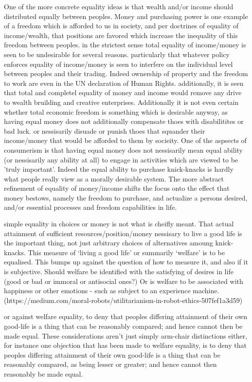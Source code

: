 One of the more concrete equality ideas is that wealth and/or income should distributed equally between peoples.
Money and purchasing power is one example of a freedom which is afforded to us in society, and per doctrines of equality of income/wealth, that positions are favored which increase the inequality of this freedom between peoples.
in the strictest sense total equality of income/money is seen to be undesirable for several reasons.
particularly that whatever policy enforces equality of income/money is seen to interfere on the individual level between peoples and their trading.
Indeed ownership of property and the freedom to work are even in the UN declaration of Human Rights. additionally, it is seen that total and completel equality of money and income would remove any drive to wealth bruilding and creative enterprises.
Additionally it is not even certain whether total economic freedom is something which is desirable anyway, as having equal money does not additionally compensate thoes with disabilitites or bad luck.
or nessisarily disuade or punish thoes that squander their income/money that would be afforded to them by socieity.
One of the aspsects of consumerism is that having equal money does not nessisarily mean equal ability (or nessisarily any ability at all) to engage in activities which are viewed to be 'truly important'.
Indeed the equal ability to purchase knick-knacks is hardly what people really view as a morally desirable system.
The more abstract refinement of equality of money/income shifts the focus onto the effect that money bestows, namely the freedom to purchase, and actualize a persons desired, and/or essential processes and freedom capabilities in life.


simple equality in choices or money is not what is cheifly meant. That actual attainment of sufficient resources/position/money nessisary to live a good life is the important thing, not just arbitrary choices of alternatives amoung knick-knacks.
This measure of `living a good life' or summarily `welfare' is to be equalised.
This bumps up against the question of how to measure it, and also if it is subjective.
Should welfare be identified with the satisfying of desires in life (good or bad or immoral or antisocial ones?)
Or is welfare to be associated with happiness or other emotions - such as subject to an experience machine.\cite{nozick2013anarchy}
(https://medium.com/moral-robots/utilitarianism-in-robot-ethics-507fef1a3d59)

or against welfare equality, to deny that peoples differing attainment of their own good-life is a thing that can be reasonably compared; and hence cannot then be made equal.
These considerations aren't just simply arm-chair distinctions either, for instance one objection that has been made to welfare equality, is to deny that peoples differing attainment of their own good-life is a thing that can be reasonably compared, as being lesser or greater; and hence cannot then reasonably be made equal.

